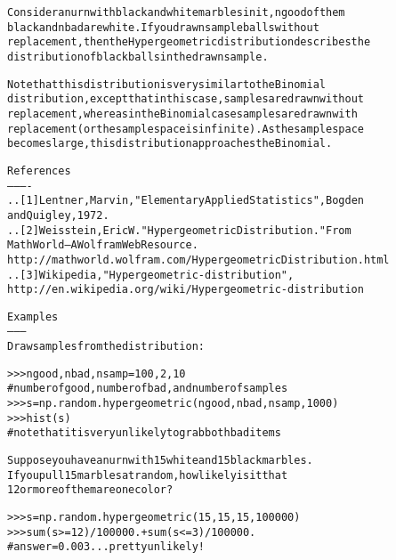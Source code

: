 \begin{boxedminipage}{\funcwidth}
\begin{alltt}
Consider an urn with black and white marbles in it, ngood of them
black and nbad are white. If you draw nsample balls without
replacement, then the Hypergeometric distribution describes the
distribution of black balls in the drawn sample.

Note that this distribution is very similar to the Binomial
distribution, except that in this case, samples are drawn without
replacement, whereas in the Binomial case samples are drawn with
replacement (or the sample space is infinite). As the sample space
becomes large, this distribution approaches the Binomial.

References
----------
.. [1] Lentner, Marvin, "Elementary Applied Statistics", Bogden
       and Quigley, 1972.
.. [2] Weisstein, Eric W. "Hypergeometric Distribution." From
       MathWorld--A Wolfram Web Resource.
       http://mathworld.wolfram.com/HypergeometricDistribution.html
.. [3] Wikipedia, "Hypergeometric-distribution",
       http://en.wikipedia.org/wiki/Hypergeometric-distribution

Examples
--------
Draw samples from the distribution:

{\textgreater}{\textgreater}{\textgreater} ngood, nbad, nsamp = 100, 2, 10
\# number of good, number of bad, and number of samples
{\textgreater}{\textgreater}{\textgreater} s = np.random.hypergeometric(ngood, nbad, nsamp, 1000)
{\textgreater}{\textgreater}{\textgreater} hist(s)
\#   note that it is very unlikely to grab both bad items

Suppose you have an urn with 15 white and 15 black marbles.
If you pull 15 marbles at random, how likely is it that
12 or more of them are one color?

{\textgreater}{\textgreater}{\textgreater} s = np.random.hypergeometric(15, 15, 15, 100000)
{\textgreater}{\textgreater}{\textgreater} sum(s{\textgreater}=12)/100000. + sum(s{\textless}=3)/100000.
\#   answer = 0.003 ... pretty unlikely!
\end{alltt}

\setlength{\parskip}{1ex}
    \end{boxedminipage}

    \label{trunk:qstkutil:bollinger:laplace}

    \vspace{0.5ex}

